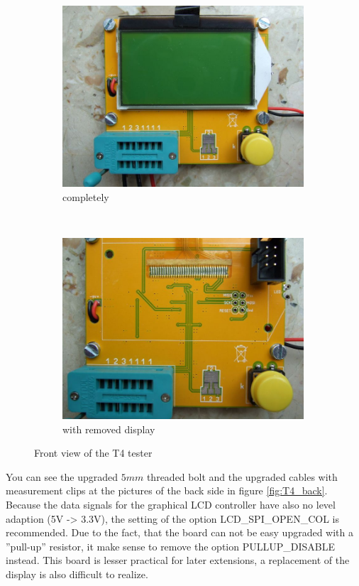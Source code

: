 \begin{figure}[H]
  \begin{subfigure}[b]{9cm}
    \centering
    \includegraphics[width=9cm]{../PNG/T4_front.JPG}
    \caption{completely}
  \end{subfigure}
  ~
  \begin{subfigure}[b]{9cm}
    \centering
    \includegraphics[width=9cm]{../PNG/T4_front_noLCD.JPG}
    \caption{with removed display}
  \end{subfigure}
  \caption{Front view of the T4 tester}
  \label{fig:T4_front}
\end{figure}

You can see the upgraded \(5mm\) threaded bolt and the upgraded cables with measurement clips
at the pictures of the back side in figure \ref{fig:T4_back}.
Because the data signals for the graphical LCD controller have also no
level adaption (5V -> 3.3V), the setting of the option LCD\_SPI\_OPEN\_COL is recommended.
Due to the fact, that the board can not be easy upgraded with a ''pull-up'' resistor,
it make sense to remove the option PULLUP\_DISABLE instead. 
This board is lesser practical for later extensions, a replacement of the display is
also difficult to realize.

